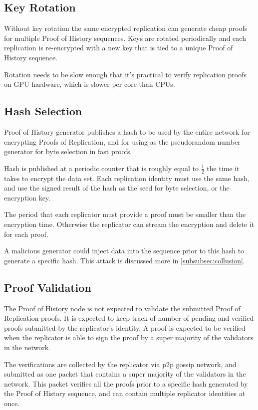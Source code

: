 \documentclass[12pt]{article}
\begin{document}
\subsection{Key Rotation}

Without key rotation the same encrypted replication can generate cheap proofs for multiple Proof of History sequences. Keys are rotated periodically and each replication is re-encrypted with a new key that is tied to a unique Proof of History sequence.

Rotation needs to be slow enough that it’s practical to verify replication proofs on GPU hardware, which is slower per core than CPUs.

\subsection{Hash Selection}\label{hashselection}

Proof of History generator publishes a hash to be used by the entire network for encrypting Proofs of Replication, and for using as the pseudorandom number generator for byte selection in fast proofs.

Hash is published at a periodic counter that is roughly equal to \(\frac{1}{2}\) the time it takes to encrypt the data set. Each replication identity must use the same hash, and use the signed result of the hash as the seed for byte selection, or the encryption key.

The period that each replicator must provide a proof must be smaller than the encryption time. Otherwise the replicator can stream the encryption and delete it for each proof.

A malicious generator could inject data into the sequence prior to this hash to generate a specific hash. This attack is discussed more in \ref{subsubsec:collusion}.

\subsection{Proof Validation}
The Proof of History node is not expected to validate the submitted Proof of Replication proofs. It is expected to keep track of number of pending and verified proofs submitted by the replicator’s identity. A proof is expected to be verified when the replicator is able to sign the proof by a super majority of the validators in the network.

The verifications are collected by the replicator via p2p gossip network, and submitted as one packet that contains a super majority of the validators in the network. This packet verifies all the proofs prior to a specific hash generated by the Proof of History sequence, and can contain multiple replicator identities at once.
\end{document}
